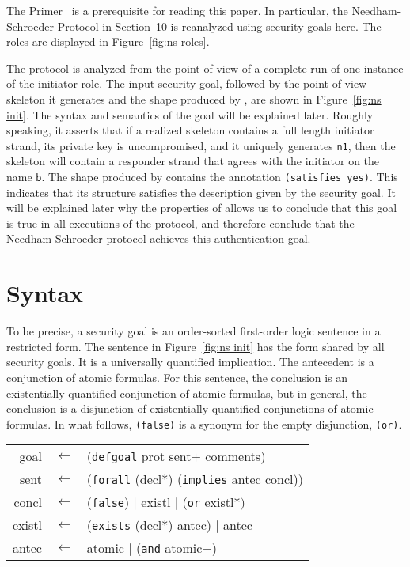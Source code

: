 \documentclass[12pt]{article}
\newcommand{\sym}[1]{\textup{\texttt{#1}}}
\begin{document}
The {\cpsa} Primer~\cite{cpsaprimer09} is a prerequisite for reading
this paper.  In particular, the Needham-Schroeder Protocol in
Section~10 is reanalyzed using security goals here.  The roles are
displayed in Figure~\ref{fig:ns roles}.

The protocol is analyzed from the point of view of a complete run of
one instance of the initiator role.  The input security goal, followed
by the point of view skeleton it generates and the shape produced by
{\cpsa}, are shown in Figure~\ref{fig:ns init}.  The syntax and
semantics of the goal will be explained later.  Roughly speaking, it
asserts that if a realized skeleton contains a full length initiator
strand, its private key is uncompromised, and it uniquely generates
\texttt{n1}, then the skeleton will contain a responder strand that
agrees with the initiator on the name \texttt{b}.  The shape produced
by {\cpsa} contains the annotation \texttt{(satisfies yes)}.  This
indicates that its structure satisfies the description given by the
security goal.  It will be explained later why the properties of
{\cpsa} allows us to conclude that this goal is true in all executions
of the protocol, and therefore conclude that the Needham-Schroeder
protocol achieves this authentication goal.

\section{Syntax}\label{sec:syntax}

To be precise, a security goal is an order-sorted first-order logic
sentence in a restricted form.  The sentence in Figure~\ref{fig:ns
  init} has the form shared by all security goals.  It is a
universally quantified implication.  The antecedent is a conjunction
of atomic formulas.  For this sentence, the conclusion is an
existentially quantified conjunction of atomic formulas, but in
general, the conclusion is a disjunction of existentially quantified
conjunctions of atomic formulas.  In what follows, \sym{(false)} is a
synonym for the empty disjunction, \sym{(or)}.

\begin{center}\scshape
  \begin{tabular}{rcl}
  goal&$\leftarrow$&(\sym{defgoal} prot sent$+$ comments)
  \\ sent&$\leftarrow$&(\sym{forall} (decl$\ast$) (\sym{implies} antec concl))
  \\ concl&$\leftarrow$&(\sym{false})
  $\mid$ existl $\mid$ (\sym{or} existl$\ast)$
  \\ existl&$\leftarrow$&(\sym{exists}
  (decl$\ast$) antec) $\mid$ antec
  \\ antec&$\leftarrow$&atomic $\mid$ (\sym{and} atomic+)
  \end{tabular}
\end{center}
\end{document}
